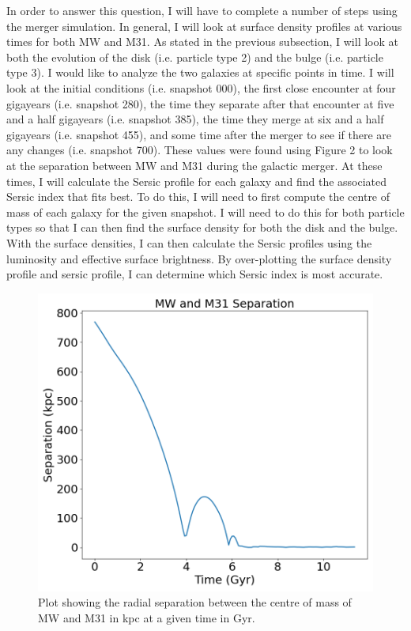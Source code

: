 \documentclass[linenumbers,trackchanges]{aastex7}
\begin{document}
In order to answer this question, I will have to complete a number of steps
using the merger simulation. In general, I will look at surface density
profiles at various times for both MW and M31. As stated in the previous
subsection, I will look at both the evolution of the disk (i.e. particle type
2) and the bulge (i.e. particle type 3). I would like to analyze the two
galaxies at specific points in time. I will look at the initial conditions
(i.e. snapshot 000), the first close encounter at four gigayears (i.e.
snapshot 280), the time they separate after that encounter at five and a half
gigayears (i.e. snapshot 385), the time they merge at six and a half
gigayears (i.e. snapshot 455), and some time after the merger to see if there
are any changes (i.e. snapshot 700). These values were found using Figure 2
to look at the separation between MW and M31 during the galactic merger. At
these times, I will calculate the Sersic profile for each galaxy and find the
associated Sersic index that fits best. To do this, I will need to first
compute the centre of mass of each galaxy for the given snapshot. I will need
to do this for both particle types so that I can then find the surface density
for both the disk and the bulge. With the surface densities, I can then
calculate the Sersic profiles using the luminosity and effective surface
brightness. By over-plotting the surface density profile and sersic profile, I
can determine which Sersic index is most accurate.

\begin{figure}[h!]
\centering
\includegraphics[scale=0.25]{MWM31RS.png}
\caption{Plot showing the radial separation between the centre of mass of MW and M31 in kpc at a given time in Gyr.
\label{fig:general}}
\end{figure}
\end{document}
